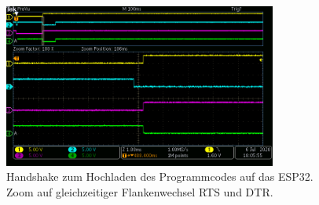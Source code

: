 \begin{figure}[H]
\center
\includegraphics[width = 0.8\textwidth]{graphics/ESP32_RTS_DTR_EN_IO0_mit_Bruecke_1}
\caption{Handshake zum Hochladen des Programmcodes auf das ESP32. Zoom auf gleichzeitiger Flankenwechsel RTS und DTR.}
\label{fig:ESP32_RTS_DTR_EN_IO0_mit_Bruecke_1}
\end{figure}
